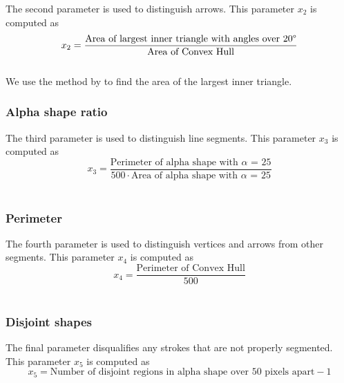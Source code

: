 The second parameter is used to distinguish arrows. This parameter $x_2$ is computed as \\

\begin{equation}
	x_2 = \frac{\text{Area of largest inner triangle with angles over 20\textdegree}}{\text{Area of Convex Hull}}
\end{equation} \\

We use the method by \citeauthor{largesttriangle} \cite{largesttriangle} to find the area of the largest inner triangle.

\subsubsection{Alpha shape ratio}

The third parameter is used to distinguish line segments. This parameter $x_3$ is computed as \\

\begin{equation}
	x_3 = \frac{\text{Perimeter of alpha shape with $\alpha$ = 25}}{500 \cdot \text{Area of alpha shape with $\alpha$ = 25}}
\end{equation} \\

\subsubsection{Perimeter}

The fourth parameter is used to distinguish vertices and arrows from other segments. This parameter $x_4$ is computed as \\

\begin{equation}
	x_4 = \frac{\text{Perimeter of Convex Hull}}{\text{500}}
\end{equation} \\

\subsubsection{Disjoint shapes}

The final parameter disqualifies any strokes that are not properly segmented. This parameter $x_5$ is computed as \\

\begin{equation}
	x_5 = \text{Number of disjoint regions in alpha shape over 50 pixels apart} - 1
\end{equation} \\

